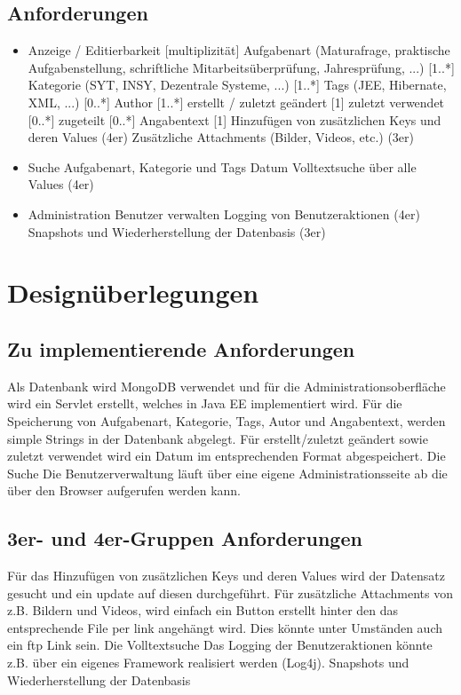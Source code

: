 \documentclass[a4paper,12pt]{scrreprt}
\begin{document}
\section{Anforderungen}
\begin{itemize}
\item Anzeige / Editierbarkeit [multiplizität]
\subitem Aufgabenart (Maturafrage, praktische Aufgabenstellung, schriftliche Mitarbeitsüberprüfung, Jahresprüfung, ...) [1..*]
\subitem Kategorie (SYT, INSY, Dezentrale Systeme, ...) [1..*]
\subitem Tags (JEE, Hibernate, XML, ...) [0..*]
\subitem Author [1..*]
\subitem erstellt / zuletzt geändert [1]
\subitem zuletzt verwendet [0..*]
\subitem zugeteilt [0..*]
\subitem Angabentext [1]
\subitem Hinzufügen von zusätzlichen Keys und deren Values (4er)
\subitem Zusätzliche Attachments (Bilder, Videos, etc.) (3er)
\item Suche
\subitem Aufgabenart, Kategorie und Tags
\subitem Datum
\subitem Volltextsuche über alle Values (4er)
\item Administration
\subitem Benutzer verwalten
\subitem Logging von Benutzeraktionen (4er)
\subitem Snapshots und Wiederherstellung der Datenbasis (3er)
\end{itemize}
\chapter{Designüberlegungen}
\section{Zu implementierende Anforderungen}
Als Datenbank wird MongoDB verwendet und für die Administrationsoberfläche wird ein Servlet erstellt, welches in Java EE implementiert wird. Für die Speicherung von Aufgabenart, Kategorie, Tags, Autor und Angabentext, werden simple Strings in der Datenbank abgelegt. Für erstellt/zuletzt geändert sowie zuletzt verwendet wird ein Datum im entsprechenden Format abgespeichert. Die Suche %
Die Benutzerverwaltung läuft über eine eigene Administrationsseite ab die über den Browser aufgerufen werden kann. 

\section{3er- und 4er-Gruppen Anforderungen}
Für das Hinzufügen von zusätzlichen Keys und deren Values wird der Datensatz  gesucht und ein update auf diesen durchgeführt. Für zusätzliche Attachments von z.B. Bildern und Videos, wird einfach ein Button erstellt hinter den das entsprechende File per link angehängt wird. Dies könnte unter Umständen auch ein ftp Link sein. Die Volltextsuche %
Das Logging der Benutzeraktionen könnte z.B. über ein eigenes Framework realisiert werden (Log4j). Snapshots und Wiederherstellung der Datenbasis %
\end{document}
